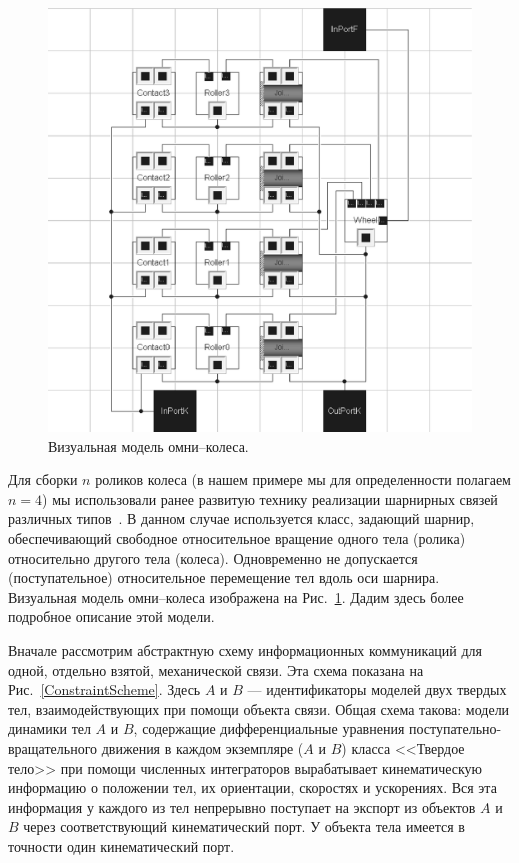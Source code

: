 \begin{figure}[htb]
\centering\includegraphics[width=15cm]{content/parts/3_friction/nd/OmniWheelModel.eps}
\caption{Визуальная модель омни--колеса.}
\label{OmniWheelModel}
\end{figure}

Для сборки $n$ роликов колеса (в нашем примере мы для определенности полагаем
$n=4$) мы использовали ранее развитую технику реализации шарнирных связей
различных типов~\cite{Kosenko2007}. В данном случае используется класс, 
задающий шарнир, обеспечивающий свободное относительное вращение одного тела
(ролика) относительно другого тела (колеса). Одновременно не допускается 
(поступательное) относительное перемещение тел вдоль оси шарнира. Визуальная 
модель омни--колеса изображена на Рис.~\ref{OmniWheelModel}. Дадим здесь более
подробное описание этой модели.

Вначале рассмотрим абстрактную схему информационных коммуникаций для одной,
отдельно взятой, механической связи. Эта схема показана на 
Рис.~\ref{ConstraintScheme}. Здесь $A$ и $B$ --- идентификаторы моделей двух 
твердых тел, взаимодействующих при помощи объекта связи. Общая схема такова: 
модели динамики тел $A$ и $B$, содержащие дифференциальные уравнения 
поступательно-вращательного движения в каждом экземпляре ($A$ и $B$) класса
<<Твердое тело>> при помощи численных интеграторов вырабатывает кинематическую
информацию о положении тел, их ориентации, скоростях и ускорениях. Вся эта 
информация у каждого из тел непрерывно поступает на экспорт из объектов $A$ и 
$B$ через соответствующий кинематический порт. У объекта тела имеется в 
точности один кинематический порт.

